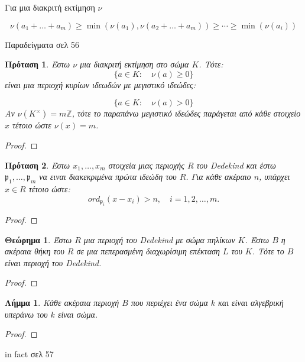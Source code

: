 \documentclass[oneside,a4paper]{article}
\newtheorem{theorem}{Θεώρημα}
\newtheorem{lemma}{Λήμμα}
\newtheorem{prop}{Πρόταση}
\newcommand {\tl}{\textlatin}
\newcommand{\Z}{\mathbb{Z}}
\begin{document}
Για μια διακριτή εκτίμηση $\nu$

$$\nu(a_1 + \ldots + a_m) \geq \min (\nu(a_1), \nu(a_2 + \ldots + a_m)) \geq \cdots \geq \min(\nu(a_i))$$

Παραδείγματα σελ 56

\begin{prop} Έστω $\nu$ μια διακριτή εκτίμηση στο σώμα $K$. Τότε:
	$$\{a \in K: \quad \nu(a) \geq 0 \}$$ είναι μια περιοχή κυρίων ιδεωδών με μεγιστικό ιδεώδες:

	$$\{a \in K: \quad \nu(a) > 0 \}$$ Αν $\nu(K^{\times}) = m\Z$, τότε το παραπάνω μεγιστικό ιδεώδες παράγεται από κάθε στοιχείο $x$ τέτοιο ώστε $\nu(x) = m$.
\end{prop}

\begin{proof}
\end{proof}

\begin{prop} Έστω $x_1,\ldots,x_m$ στοιχεία μιας περιοχής $R$ του \tl{Dedekind} και έστω $\mathfrak{p}_1,\ldots,\mathfrak{p}_m$ να ειναι διακεκριμένα πρώτα ιδεώδη του $R$. Για κάθε ακέραιο $n$, υπάρχει $x \in R$ τέτοιο ώστε:
	$$ord_{\mathfrak{p}_i} (x-x_i) > n, \quad i=1,2,\ldots,m.$$
\end{prop}

\begin{proof} %
\end{proof}


\begin{theorem}Έστω $R$ μια περιοχή του \tl{Dedekind} με σώμα πηλίκων $K$. Έστω $B$ η ακέραια θήκη του $R$ σε μια πεπερασμένη διαχωρίσιμη επέκταση $L$ του $K$. Τότε το $B$ είναι περιοχή του \tl{Dedekind}.
	\end{theorem}

	\begin{proof}
	\end{proof}

\begin{lemma}
	Κάθε ακέραια περιοχή $B$ που περιέχει ένα σώμα $k$ και είναι αλγεβρική υπεράνω του $k$ είναι σώμα.
\end{lemma}

\begin{proof}
\end{proof}


\tl{in fact} σελ 57



\pagebreak

\end{document}
